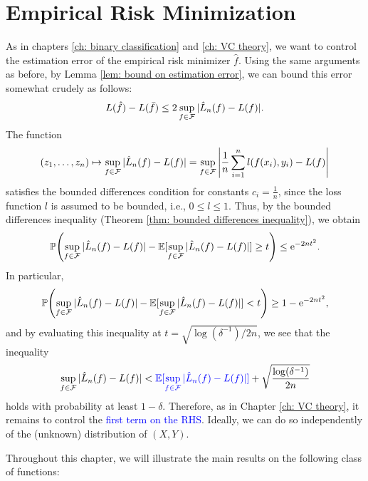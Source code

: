 \section{Empirical Risk Minimization}
\label{subsec: empirical risk minimization for general loss function}

As in chapters \ref{ch: binary classification} and \ref{ch: VC theory}, we want to control the estimation error of the empirical risk minimizer $\hat{f}$. Using the same arguments as before, by Lemma \ref{lem: bound on estimation error}, we can bound this error somewhat crudely as follows:
\[
    L(\hat{f}) - L(\bar{f}) \leq 2 \sup_{f \in \mathcal{F}} \abs*{\hat{L}_n(f) - L(f)}.
\]
The function
\[
    (z_1, \dots, z_n) \mapsto \sup_{f \in \mathcal{F}} \abs*{\hat{L}_n(f) - L(f)} = \sup_{f \in \mathcal{F}} \abs{\frac{1}{n} \sum_{i=1}^n l(f(x_i), y_i) - L(f)}
\]
satisfies the bounded differences condition for constants $c_i = \frac{1}{n}$, since the loss function $l$ is assumed to be bounded, i.e., $0 \leq l \leq 1$. Thus, by the bounded differences inequality (Theorem \ref{thm: bounded differences inequality}), we obtain
\[
    \P\left(\sup_{f \in \mathcal{F}} \abs*{\hat{L}_n(f) - L(f)} - \Exp[\sup_{f \in \mathcal{F}} \abs*{\hat L_n(f) - L(f)}] \geq t\right) \leq \e^{-2nt^2}.
\]
In particular,
\[
    \P\left(\sup_{f \in \mathcal{F}} \abs*{\hat{L}_n(f) - L(f)} - \Exp[\sup_{f \in \mathcal{F}} \abs*{\hat{L}_n(f) - L(f)}] < t\right) \geq 1 - \e^{-2nt^2},
\]
and by evaluating this inequality at $t = \sqrt{\log(\delta^{-1}) / 2n}$, we see that the inequality
\[
    \sup_{f \in \mathcal{F}} \abs*{\hat{L}_n(f) - L(f)} < {\color{blue} \Exp[\sup_{f \in \mathcal{F}} \abs*{\hat L_n(f) - L(f)}]} + \sqrt{\frac{\log(\delta^{-1})}{2n}}
\]
holds with probability at least $1 - \delta$. Therefore, as in Chapter \ref{ch: VC theory}, it remains to control the \textcolor{blue}{first term on the RHS}. Ideally, we can do so independently of the (unknown) distribution of $(X, Y)$.

Throughout this chapter, we will illustrate the main results on the following class of functions:

